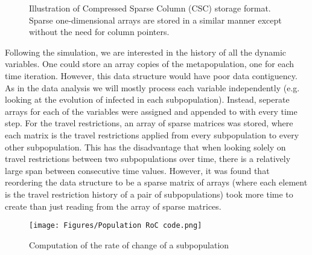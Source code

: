 \begin{figure}[htbp]
	\centering

	\caption{Illustration of Compressed Sparse Column (CSC) storage format. Sparse one-dimensional arrays are stored in a similar manner except without the need for column pointers.}
	\end{figure}

Following the simulation, we are interested in the history of all the dynamic variables. One could store an array copies of the metapopulation, one for each time iteration. However, this data structure would have poor data contiguency. As in the data analysis we will mostly process each variable independently (e.g. looking at the evolution of infected in each subpopulation). Instead, seperate arrays for each of the variables were assigned and appended to with every time step. For the travel restrictions, an array of sparse matrices was stored, where each matrix is the travel restrictions applied from every subpopulation to every other subpopulation. This has the disadvantage that when looking solely on travel restrictions between two subpopulations over time, there is a relatively large span between consecutive time values. However, it was found that reordering the data structure to be a sparse matrix of arrays (where each element is the travel restriction history of a pair of subpopulations) took more time to create than just reading from the array of sparse matrices.\\
\begin{figure}
	\centering
	\texttt{[image: Figures/Population RoC code.png]}
	\caption{\small Computation of the rate of change of a subpopulation}
\end{figure}

